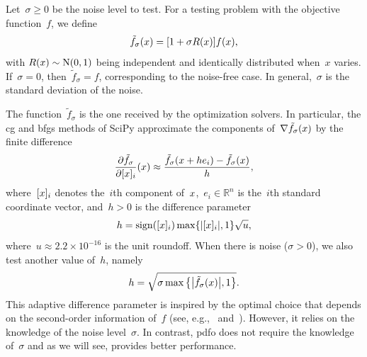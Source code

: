 \documentclass[smallextended]{svjour3}
\DeclareMathOperator{\sgn}{sign}
\newcommand{\abs}[2][]{#1\lvert#2#1\rvert}
\newcommand{\set}[2][]{#1\{#2#1\}}
\newcommand{\NN}{\mathrm{N}}
\newcommand{\R}{\mathbb{R}}
\newcommand{\iter}[1][k]{x\ifthenelse{\equal{#1}{}}{}{_{#1}}}
\newcommand{\obj}{f}
\newcommand{\modified}[1]{#1}
\begin{document}
Let~$\sigma \ge 0$ be the noise level to test.
For a testing problem with the objective function~$\obj$, we define
\begin{equation}
    \label{eq:noisy-obj}
    \tilde{\obj}_\sigma(\iter[]) = [1 + \sigma R(\iter[])] \obj(\iter[]),
\end{equation}
with $R(\iter[])\sim \NN(0, 1)$ being independent and identically distributed when~$x$ varies.
If~$\sigma = 0$, then~$\tilde{f}_\sigma = f$, corresponding to the noise-free case.
In general,~$\sigma$ \modified{is} the standard deviation of the noise.
\modified{
    The function~$\tilde{\obj}_\sigma$ is the one received by the optimization solvers.
    In particular, the \gls{cg} and \gls{bfgs} methods of SciPy approximate the components of~$\nabla \tilde{\obj}_\sigma(\iter[])$ by the finite difference
    \begin{equation*}
        \frac{\partial \tilde{\obj}_\sigma}{\partial [{\iter[]}]_i}(\iter[]) \approx \frac{\tilde{\obj}_\sigma(\iter[] + h e_i) - \tilde{\obj}_\sigma(\iter[])}{h},
    \end{equation*}
    where~$[{\iter[]}]_i$ denotes the~$i$th component of~$\iter[]$,~$e_i \in \R^n$ is the~$i$th standard coordinate vector, and~$h > 0$ is the difference parameter
    \begin{equation}
        \label{eq:scipy-h}
        h = \sgn([{\iter[]}]_i) \max \set{\abs{[{\iter[]}]_i}, 1} \sqrt{u},
    \end{equation}
    where~$u \approx 2.2 \times 10^{-16}$ is the unit roundoff.
    When there is noise ($\sigma > 0$), we also test another value of~$h$, namely
    \begin{equation}
        \label{eq:adaptive-h}
        h = \sqrt{\sigma \max \set[\big]{\abs[\big]{\tilde{\obj}_\sigma(\iter[])}, 1}}.
    \end{equation}
    This adaptive difference parameter is inspired by the optimal choice that depends on the second-order information of~$\obj$ (see, e.g.,~\cite{More_Wild_2012} and~\cite[Equation~(2.2)]{Shi_Etal_2022a}).
    However, it relies on the knowledge of the noise level~$\sigma$.
    In contrast, \gls{pdfo} does not require the knowledge of~$\sigma$ and as we will see, provides better performance.
}
\end{document}
